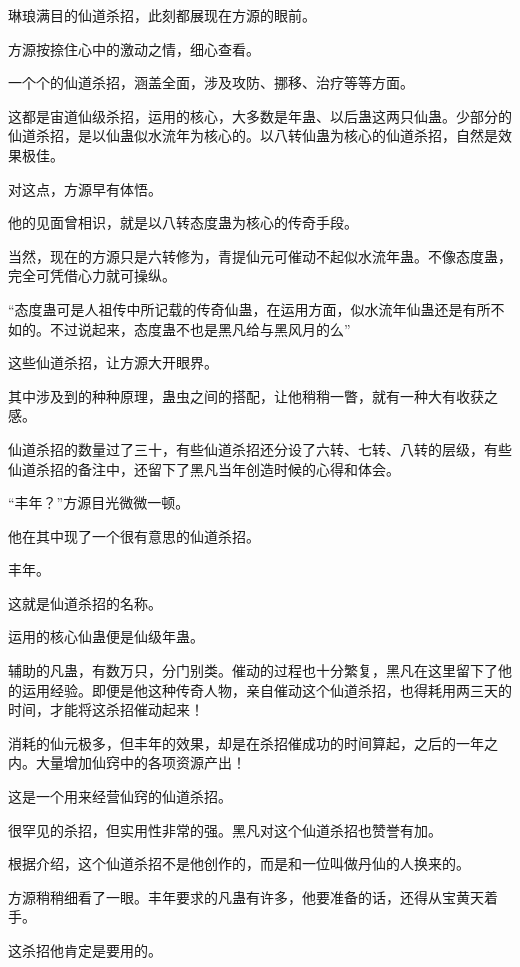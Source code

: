 
\begin{this_body}

琳琅满目的仙道杀招，此刻都展现在方源的眼前。

方源按捺住心中的激动之情，细心查看。

一个个的仙道杀招，涵盖全面，涉及攻防、挪移、治疗等等方面。

这都是宙道仙级杀招，运用的核心，大多数是年蛊、以后蛊这两只仙蛊。少部分的仙道杀招，是以仙蛊似水流年为核心的。以八转仙蛊为核心的仙道杀招，自然是效果极佳。

对这点，方源早有体悟。

他的见面曾相识，就是以八转态度蛊为核心的传奇手段。

当然，现在的方源只是六转修为，青提仙元可催动不起似水流年蛊。不像态度蛊，完全可凭借心力就可操纵。

“态度蛊可是人祖传中所记载的传奇仙蛊，在运用方面，似水流年仙蛊还是有所不如的。不过说起来，态度蛊不也是黑凡给与黑风月的么”

这些仙道杀招，让方源大开眼界。

其中涉及到的种种原理，蛊虫之间的搭配，让他稍稍一瞥，就有一种大有收获之感。

仙道杀招的数量过了三十，有些仙道杀招还分设了六转、七转、八转的层级，有些仙道杀招的备注中，还留下了黑凡当年创造时候的心得和体会。

“丰年？”方源目光微微一顿。

他在其中现了一个很有意思的仙道杀招。

丰年。

这就是仙道杀招的名称。

运用的核心仙蛊便是仙级年蛊。

辅助的凡蛊，有数万只，分门别类。催动的过程也十分繁复，黑凡在这里留下了他的运用经验。即便是他这种传奇人物，亲自催动这个仙道杀招，也得耗用两三天的时间，才能将这杀招催动起来！

消耗的仙元极多，但丰年的效果，却是在杀招催成功的时间算起，之后的一年之内。大量增加仙窍中的各项资源产出！

这是一个用来经营仙窍的仙道杀招。

很罕见的杀招，但实用性非常的强。黑凡对这个仙道杀招也赞誉有加。

根据介绍，这个仙道杀招不是他创作的，而是和一位叫做丹仙的人换来的。

方源稍稍细看了一眼。丰年要求的凡蛊有许多，他要准备的话，还得从宝黄天着手。

这杀招他肯定是要用的。


\end{this_body}
